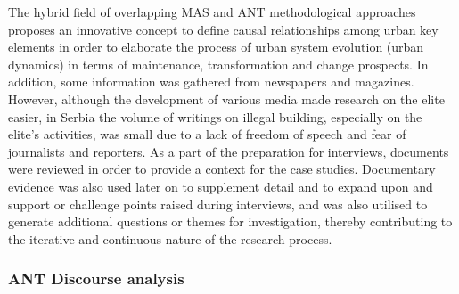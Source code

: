 \documentclass[11pt]{report}
\begin{document}
The hybrid field of overlapping MAS and ANT methodological approaches proposes an innovative concept to define causal relationships among urban key elements in order to elaborate the process of urban system evolution (urban dynamics) in terms of maintenance, transformation and change prospects. In  addition,  some  information  was  gathered  from  newspapers  and  magazines. However,  although  the  development  of  various  media  made  research  on  the  elite easier, in Serbia the volume of writings on illegal building, especially on the elite’s activities, was small due to a lack of freedom of speech and fear of journalists and reporters. As  a  part  of  the  preparation  for  interviews,  documents  were  reviewed  in  order  to provide  a  context  for  the  case  studies. Documentary evidence was also used later on to supplement detail and to expand upon and support or challenge points raised during interviews, and was also 
utilised  to  generate  additional  questions  or  themes  for  investigation,  thereby contributing to the iterative and continuous nature of the research process.  

\subsubsection{ANT Discourse analysis}
\end{document}
